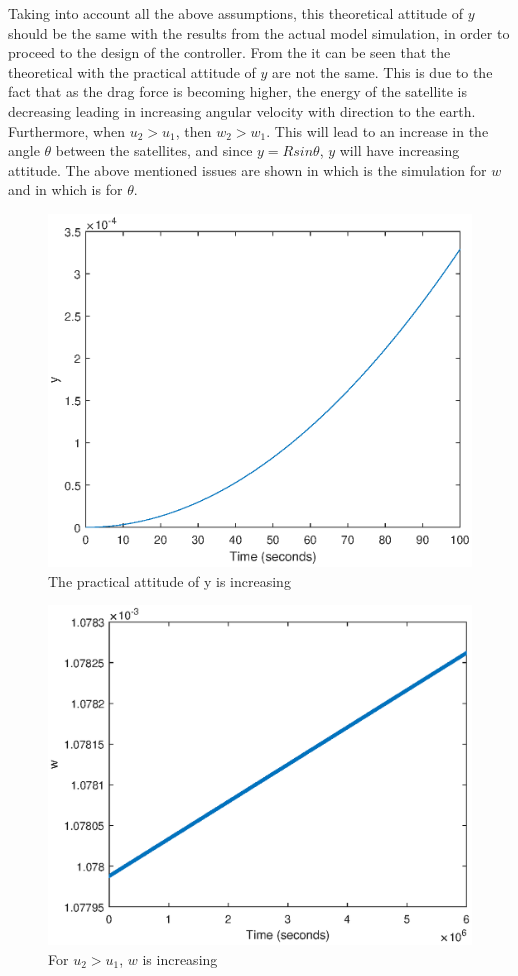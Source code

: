 % 
Taking into account all the above assumptions, this theoretical attitude of $y$ should be the same with the results from the actual model simulation, in order to proceed to the design of the controller. From the  it can be seen that the theoretical with the practical attitude of $y$  are not the same. This is due to the fact that as the drag force is becoming higher, the energy of the satellite is decreasing leading in increasing angular velocity with direction to the earth. Furthermore, when $u_2 > u_1$, then $w_2 > w_1$. This will lead to an increase in the angle $\theta$ between the satellites, and since $y = Rsin\theta$, $y$ will have increasing attitude. The above mentioned issues are shown in  which is the simulation for $w$ and in   which is for $\theta$.    
%  
\begin{figure}[H]
	\centering
	\includegraphics[width=0.6\linewidth]
	{figures/practiceapprox.eps}
	\caption{The practical attitude of y is increasing }
	\label{fig:practiceapprox}
\end{figure}
%
\begin{figure}[H]
	\centering
	\includegraphics[width=0.6\linewidth]
	{figures/nonomega.eps}
	\caption{For $u_2 >u_1$, $w$ is increasing  }
	\label{fig:inomega}
\end{figure}
